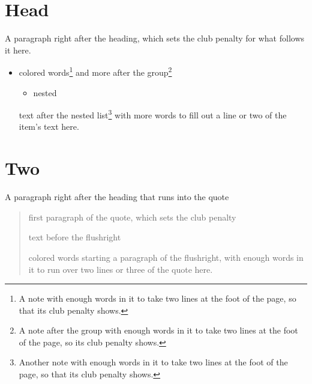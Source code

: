 \documentclass{article}
\begin{document}
\section{Head}
A paragraph right after the heading, which sets the club penalty for what follows it here.

\begin{itemize}
\item {\color{gray} colored words\footnote{A note with enough words in it to take two lines at the foot of the page, so that its club penalty shows.} and more} after the group\footnote{A note after the group with enough words in it to take two lines at the foot of the page, so its club penalty shows.}
\begin{itemize}
\item nested
\end{itemize}
text after the nested list\footnote{Another note with enough words in it to take two lines at the foot of the page, so that its club penalty shows.} with more words to fill out a line or two of the item's text here.
\end{itemize}

\section{Two}
A paragraph right after the heading that runs into the quote
\begin{quote}
first paragraph of the quote, which sets the club penalty

text before the flushright
\begin{flushright}
{\color{blue} colored} words starting a paragraph of the flushright, with enough words in it to run over two lines or three of the quote here.
\end{flushright}
\end{quote}
\end{document}
